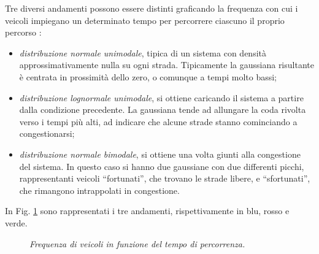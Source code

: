 \documentclass[../main.tex]{subfiles}
\begin{document}
Tre diversi andamenti possono essere distinti graficando la frequenza con cui i veicoli impiegano un determinato tempo per percorrere ciascuno il proprio percorso \cite{TravelTime}:
\begin{itemize}
    \item \emph{distribuzione normale unimodale}, tipica di un sistema con densit\`a approssimativamente nulla su ogni strada.
        Tipicamente la gaussiana risultante \`e centrata in prossimit\`a dello zero, o comunque a tempi molto bassi;
    \item \emph{distribuzione lognormale unimodale}, si ottiene caricando il sistema a partire dalla condizione precedente.
        La gaussiana tende ad allungare la coda rivolta verso i tempi pi\`u alti, ad indicare che alcune strade stanno cominciando a congestionarsi;
    \item \emph{distribuzione normale bimodale}, si ottiene una volta giunti alla congestione del sistema.
        In questo caso si hanno due gaussiane con due differenti picchi, rappresentanti veicoli ``fortunati'', che trovano le strade libere, e ``sfortunati'', che rimangono intrappolati in congestione.
\end{itemize}
In Fig. \ref{fig:frequency_distributions} sono rappresentati i tre andamenti, rispettivamente in blu, rosso e verde.
\begin{figure}[H]
    \centering
    \caption[Frequenza di veicoli in funzione del tempo di percorrenza]{\emph{Frequenza di veicoli in funzione del tempo di percorrenza.}}
    \label{fig:frequency_distributions}
\end{figure}
\end{document}
